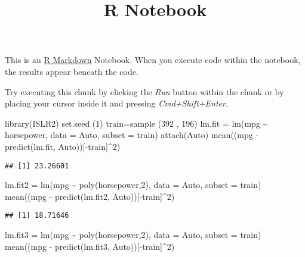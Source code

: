 \documentclass[
]{article}
\title{R Notebook}
\author{}
\date{\vspace{-2.5em}}
\newenvironment{Shaded}{\begin{snugshade}}{\end{snugshade}}
\newcommand{\AttributeTok}[1]{\textcolor[rgb]{0.77,0.63,0.00}{#1}}
\newcommand{\DecValTok}[1]{\textcolor[rgb]{0.00,0.00,0.81}{#1}}
\newcommand{\FunctionTok}[1]{\textcolor[rgb]{0.00,0.00,0.00}{#1}}
\newcommand{\NormalTok}[1]{#1}
\newcommand{\OtherTok}[1]{\textcolor[rgb]{0.56,0.35,0.01}{#1}}
\newcommand{\SpecialCharTok}[1]{\textcolor[rgb]{0.00,0.00,0.00}{#1}}
\begin{document}
\maketitle

This is an \href{http://rmarkdown.rstudio.com}{R Markdown} Notebook.
When you execute code within the notebook, the results appear beneath
the code.

Try executing this chunk by clicking the \emph{Run} button within the
chunk or by placing your cursor inside it and pressing
\emph{Cmd+Shift+Enter}.

\begin{Shaded}
\begin{Highlighting}[]
\FunctionTok{library}\NormalTok{(ISLR2)}
\FunctionTok{set.seed}\NormalTok{ (}\DecValTok{1}\NormalTok{)}
\NormalTok{train}\OtherTok{=}\FunctionTok{sample}\NormalTok{ (}\DecValTok{392}\NormalTok{ , }\DecValTok{196}\NormalTok{)}
\NormalTok{lm.fit }\OtherTok{=} \FunctionTok{lm}\NormalTok{(mpg }\SpecialCharTok{\textasciitilde{}}\NormalTok{ horsepower, }\AttributeTok{data =}\NormalTok{ Auto, }\AttributeTok{subset =}\NormalTok{ train)}
\FunctionTok{attach}\NormalTok{(Auto)}
\FunctionTok{mean}\NormalTok{((mpg }\SpecialCharTok{{-}} \FunctionTok{predict}\NormalTok{(lm.fit, Auto))[}\SpecialCharTok{{-}}\NormalTok{train]}\SpecialCharTok{\^{}}\DecValTok{2}\NormalTok{)}
\end{Highlighting}
\end{Shaded}

\begin{verbatim}
## [1] 23.26601
\end{verbatim}

\begin{Shaded}
\begin{Highlighting}[]
\NormalTok{lm.fit2 }\OtherTok{=} \FunctionTok{lm}\NormalTok{(mpg }\SpecialCharTok{\textasciitilde{}} \FunctionTok{poly}\NormalTok{(horsepower,}\DecValTok{2}\NormalTok{), }\AttributeTok{data =}\NormalTok{ Auto, }\AttributeTok{subset =}\NormalTok{ train)}
\FunctionTok{mean}\NormalTok{((mpg }\SpecialCharTok{{-}} \FunctionTok{predict}\NormalTok{(lm.fit2, Auto))[}\SpecialCharTok{{-}}\NormalTok{train]}\SpecialCharTok{\^{}}\DecValTok{2}\NormalTok{)}
\end{Highlighting}
\end{Shaded}

\begin{verbatim}
## [1] 18.71646
\end{verbatim}

\begin{Shaded}
\begin{Highlighting}[]
\NormalTok{lm.fit3 }\OtherTok{=} \FunctionTok{lm}\NormalTok{(mpg }\SpecialCharTok{\textasciitilde{}} \FunctionTok{poly}\NormalTok{(horsepower,}\DecValTok{2}\NormalTok{), }\AttributeTok{data =}\NormalTok{ Auto, }\AttributeTok{subset =}\NormalTok{ train)}
\FunctionTok{mean}\NormalTok{((mpg }\SpecialCharTok{{-}} \FunctionTok{predict}\NormalTok{(lm.fit3, Auto))[}\SpecialCharTok{{-}}\NormalTok{train]}\SpecialCharTok{\^{}}\DecValTok{2}\NormalTok{)}
\end{Highlighting}
\end{Shaded}
\end{document}
